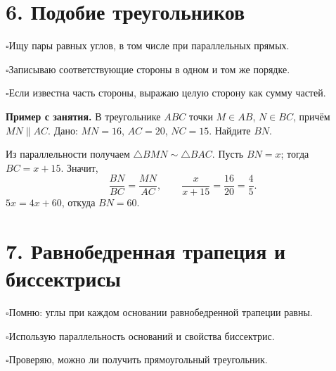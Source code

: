 \documentclass[a4paper,11pt]{article}
\newcommand{\secname}[1]{\section*{\textcolor{darkaccent}{#1}}}
\newcommand{\checkline}[1]{\par\noindent\textcolor{accent}{\(\square\)}\hspace{0.5em}#1\par}
\begin{document}
\clearpage
\secname{6. Подобие треугольников}
\checkline{Ищу пары равных углов, в том числе при параллельных прямых.}
\checkline{Записываю соответствующие стороны в одном и том же порядке.}
\checkline{Если известна часть стороны, выражаю целую сторону как сумму частей.}

\textbf{Пример с занятия.} В треугольнике \(ABC\) точки \(M\in AB\), \(N\in BC\), причём \(MN\parallel AC\). Дано: \(MN=16\), \(AC=20\), \(NC=15\). Найдите \(BN\).
\begin{center}
\end{center}
Из параллельности получаем \(\triangle BMN\sim\triangle BAC\). Пусть \(BN=x\); тогда \(BC=x+15\). Значит,
\[
\frac{BN}{BC}=\frac{MN}{AC},\qquad
\frac{x}{x+15}=\frac{16}{20}=\frac45.
\]
\(5x=4x+60\), откуда \(\boxed{BN=60}\).

\clearpage
\secname{7. Равнобедренная трапеция и биссектрисы}
\checkline{Помню: углы при каждом основании равнобедренной трапеции равны.}
\checkline{Использую параллельность оснований и свойства биссектрис.}
\checkline{Проверяю, можно ли получить прямоугольный треугольник.}
\end{document}
